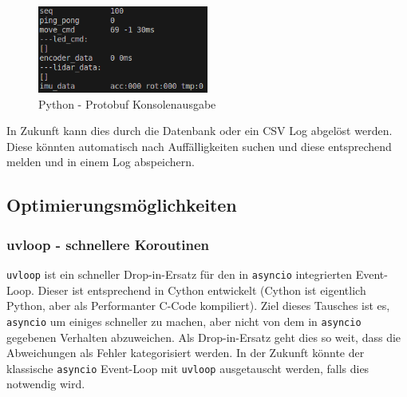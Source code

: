 \begin{figure}[H]
    \includegraphics[width=0.5\textwidth, center]{img/Backend/print_wrapper_all.png}
    \caption{Python - Protobuf Konsolenausgabe}
    \label{fig:py_konsole_o}
\end{figure}

In Zukunft kann dies durch die Datenbank oder ein CSV Log abgelöst werden.
% 
Diese könnten automatisch nach Auffälligkeiten suchen 
und diese entsprechend melden und in einem Log abspeichern.






\subsection{Optimierungsmöglichkeiten}
\label{subsec:Optimierungsmöglichkeiten}
\subsubsection{uvloop - schnellere Koroutinen}
\texttt{uvloop} ist ein schneller Drop-in-Ersatz für den in \texttt{asyncio} integrierten Event-Loop.
% 
Dieser ist entsprechend in Cython entwickelt 
(Cython ist eigentlich Python, aber als Performanter C-Code kompiliert).
%
Ziel dieses Tausches ist es,
\texttt{asyncio} um einiges schneller zu machen, 
aber nicht von dem in \texttt{asyncio} gegebenen Verhalten abzuweichen.
% 
Als Drop-in-Ersatz geht dies so weit, 
dass die Abweichungen als Fehler kategorisiert werden.
%
In der Zukunft könnte der klassische \texttt{asyncio} Event-Loop mit
\texttt{uvloop} ausgetauscht werden,
falls dies notwendig wird.

